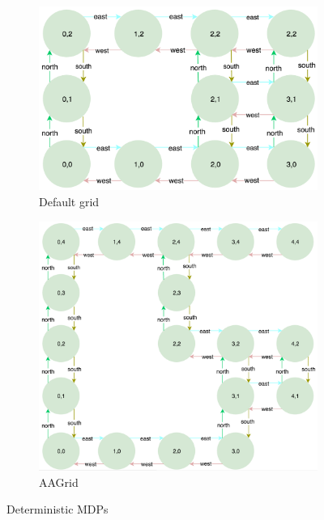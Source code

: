 \documentclass[12pt]{article}
\begin{document}
\begin{figure}[h]
    \centering
    \begin{subfigure}{.5\textwidth}
        \centering
        \includegraphics[width=.85\linewidth]{MDP_deterministic}
        \caption{Default grid}
        \label{fig:sub1}
    \end{subfigure}%
    \begin{subfigure}{.5\textwidth}
        \centering
        \includegraphics[width=.85\linewidth]{MDP_deterministic2}
        \caption{AAGrid}
        \label{fig:sub2}
    \end{subfigure}
    \caption{Deterministic MDPs}
    \label{fig:test}
\end{figure}
\end{document}
